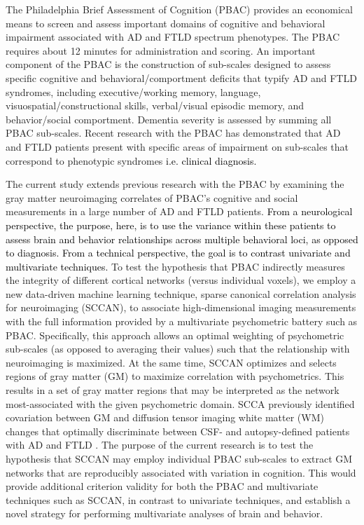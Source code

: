 \documentclass[preprint,authoryear,12pt]{elsarticle}
\begin{document}
The Philadelphia Brief Assessment of Cognition \citet{Libon2007,libon_philadelphia_2011} (PBAC) provides an economical means to screen and assess important domains of cognitive and behavioral impairment associated with AD and FTLD spectrum phenotypes.  The PBAC requires about 12 minutes for administration and scoring.  An important component of the PBAC is the construction of sub-scales designed to assess specific cognitive and behavioral/comportment deficits that typify AD and FTLD syndromes, including executive/working memory, language, visuospatial/constructional skills, verbal/visual episodic memory, and behavior/social comportment.  Dementia severity is assessed by summing all PBAC sub-scales.  Recent research with the PBAC has demonstrated that AD and FTLD patients present with specific areas of impairment on sub-scales that correspond to phenotypic syndromes \citet{libon_philadelphia_2011} \textcolor{black}{i.e. clinical diagnosis.}

The current study extends previous research with the PBAC \citet{libon_philadelphia_2011} by examining the gray matter neuroimaging correlates of PBAC's cognitive and social measurements in a large number of AD and FTLD patients.  \textcolor{black}{From a neurological perspective, the purpose, here, is to use the variance within these patients to assess brain and behavior relationships across multiple behavioral loci, as opposed to diagnosis.  From a technical perspective, the goal is to contrast univariate and multivariate techniques.}  To test the hypothesis that PBAC indirectly measures the integrity of different cortical networks (versus individual voxels), we employ a new data-driven machine learning technique, sparse canonical correlation analysis for neuroimaging (SCCAN), to associate high-dimensional imaging measurements with the full information provided by a multivariate psychometric battery such as PBAC.  Specifically, this approach allows an optimal weighting of psychometric sub-scales (as opposed to averaging their values) such that the relationship with neuroimaging is maximized.  At the same time, SCCAN optimizes and selects regions of gray matter (GM) to maximize correlation with psychometrics.  This results in a set of gray matter regions that may be interpreted as the network most-associated with the given psychometric domain.  SCCA previously identified covariation between GM and diffusion tensor imaging white matter (WM) changes that optimally discriminate between CSF- and autopsy-defined patients with AD and FTLD \citet{Avants2010b}.  The purpose of the current research is to test the hypothesis that SCCAN may employ individual PBAC sub-scales to extract GM networks that are reproducibly associated with variation in cognition.  This would provide additional criterion validity for both the PBAC and multivariate techniques such as SCCAN, in contrast to univariate techniques, and establish a novel strategy for performing multivariate analyses of brain and behavior. 
\end{document}
